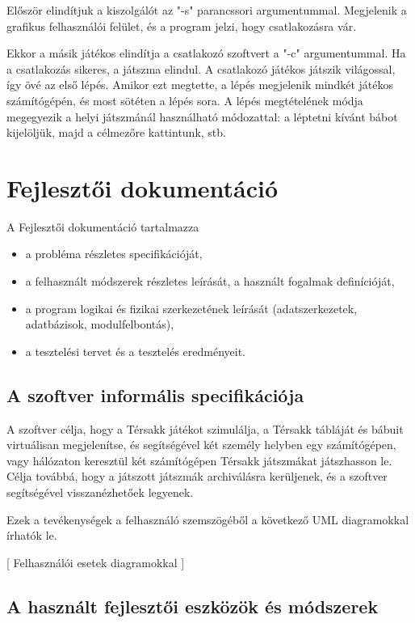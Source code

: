 \documentclass[12pt, twoside]{report}
\begin{document}
Először elindítjuk a kiszolgálót az "-s" parancssori argumentummal. Megjelenik a grafikus felhasználói felület, és a program jelzi, hogy csatlakozásra vár.

Ekkor a másik játékos elindítja a csatlakozó szoftvert a "-c" argumentummal. Ha a csatlakozás sikeres, a játszma elindul. A csatlakozó játékos játszik világossal, így övé az első lépés. Amikor ezt megtette, a lépés megjelenik mindkét játékos számítógépén, és most sötéten a lépés sora. A lépés megtételének módja megegyezik a helyi játszmánál használható módozattal: a léptetni kívánt bábot kijelöljük, majd a célmezőre kattintunk, stb.

\chapter{Fejlesztői dokumentáció}

A Fejlesztői dokumentáció tartalmazza 
\begin{itemize}
\item a probléma részletes specifikációját, 
\item a felhasznált módszerek részletes leírását, a használt fogalmak definícióját,
\item a program logikai és fizikai szerkezetének leírását (adatszerkezetek, adatbázisok, modulfelbontás),
\item a tesztelési tervet és a tesztelés eredményeit.
\end{itemize}


\section{A szoftver informális specifikációja}

A szoftver célja, hogy a Térsakk játékot szimulálja, a Térsakk tábláját és bábuit virtuálisan megjelenítse, és segítségével két személy helyben egy számítógépen, vagy hálózaton keresztül két számítógépen Térsakk játszmákat játszhasson le. Célja továbbá, hogy a játszott játszmák archiválásra kerüljenek, és a szoftver segítségével vissza\-néz\-he\-tő\-ek legyenek.

Ezek a tevékenységek a felhasználó szemszögéből a következő UML diagramokkal írhatók le.

[ Felhasználói esetek diagramokkal ]

\section{A használt fejlesztői eszközök és módszerek}
\end{document}
